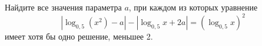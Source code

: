 \begin{ex}
	\begin{condition}
		Найдите все значения параметра \( a \), при каждом из которых уравнение \[ |\log_{0,5}(x^2)-a|-|\log_{0,5}x+2a|=(\log_{0,5}x)^2 \]
		имеет хотя бы одно решение, меньшее 2.
	\end{condition}
\end{ex}